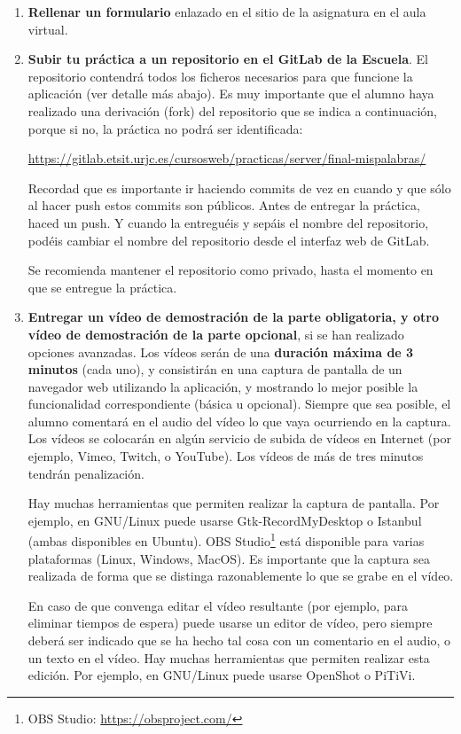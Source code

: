 \begin{enumerate}

  \item {\bf Rellenar un formulario} enlazado en el sitio de la asignatura en el aula virtual.
  
  \item {\bf Subir tu práctica a un repositorio en el GitLab de la Escuela}. El repositorio contendrá todos los ficheros necesarios para que funcione la aplicación (ver detalle más abajo). Es muy importante que el alumno haya realizado una derivación (fork) del repositorio que se indica a continuación, porque si no, la práctica no podrá ser identificada: 

\url{https://gitlab.etsit.urjc.es/cursosweb/practicas/server/final-mispalabras/}

Recordad que es importante ir haciendo commits de vez en cuando y que sólo al hacer push estos commits son públicos. Antes de entregar la práctica, haced un push. Y cuando la entreguéis y sepáis el nombre del repositorio, podéis cambiar el nombre del repositorio desde el interfaz web de GitLab. 

Se recomienda mantener el repositorio como privado, hasta el momento en que se entregue la práctica.

 \item {\bf Entregar un vídeo de demostración de la parte obligatoria, y otro vídeo de demostración de la parte opcional}, si se han realizado opciones avanzadas. Los vídeos serán de una {\bf duración máxima de 3 minutos} (cada uno), y consistirán en una captura de pantalla de un navegador web utilizando la aplicación, y mostrando lo mejor posible la funcionalidad correspondiente (básica u opcional). Siempre que sea posible, el alumno comentará en el audio del vídeo lo que vaya ocurriendo en la captura. Los vídeos se colocarán en algún servicio de subida de vídeos en Internet (por ejemplo, Vimeo, Twitch, o YouTube). Los vídeos de más de tres minutos tendrán penalización.

Hay muchas herramientas que permiten realizar la captura de pantalla. Por ejemplo, en GNU/Linux puede usarse Gtk-RecordMyDesktop o Istanbul (ambas disponibles en Ubuntu). OBS Studio\footnote{OBS Studio: \url{https://obsproject.com/}} está disponible para varias plataformas (Linux, Windows, MacOS). Es importante que la captura sea realizada de forma que se distinga razonablemente lo que se grabe en el vídeo.

En caso de que convenga editar el vídeo resultante (por ejemplo, para eliminar tiempos de espera) puede usarse un editor de vídeo, pero siempre deberá ser indicado que se ha hecho tal cosa con un comentario en el audio, o un texto en el vídeo. Hay muchas herramientas que permiten realizar esta edición. Por ejemplo, en GNU/Linux puede usarse OpenShot o PiTiVi.

\end{enumerate}

